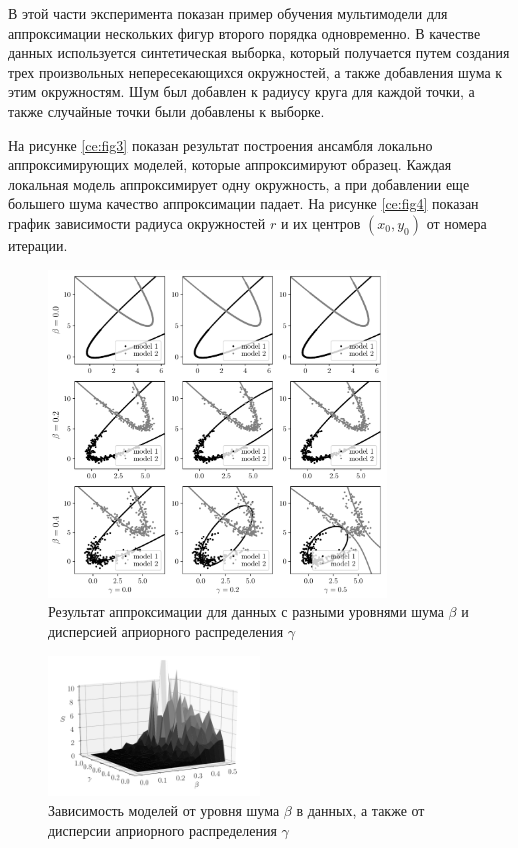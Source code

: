 В этой части эксперимента показан пример обучения мультимодели для аппроксимации нескольких фигур второго порядка одновременно. В качестве данных используется синтетическая выборка, который получается путем создания трех произвольных непересекающихся окружностей, а также добавления шума к этим окружностям. Шум был добавлен к радиусу круга для каждой точки, а также случайные точки были добавлены к выборке.

На рисунке \ref{ce:fig3} показан результат построения ансамбля локально аппроксимирующих моделей, которые аппроксимируют образец. Каждая локальная модель аппроксимирует одну окружность, а при добавлении еще большего шума качество аппроксимации падает.
На рисунке \ref{ce:fig4} показан график зависимости радиуса окружностей $ r $ и их центров $(x_0, y_0)$ от номера итерации.

\begin{figure}[h!t]
\center
\includegraphics[width=0.8\textwidth]{results/priorexpertfig/beta_gamma}
\caption{Результат аппроксимации для данных с разными уровнями шума $\beta$ и дисперсией априорного распределения $\gamma$}
\label{ce:fig6}
\end{figure}

\begin{figure}[h!t]
\center
\includegraphics[width=0.5\textwidth]{results/priorexpertfig/3dplot}
\caption{Зависимость моделей от уровня шума $\beta$ в данных, а также от дисперсии априорного распределения $\gamma$}
\label{ce:fig5}
\end{figure}

